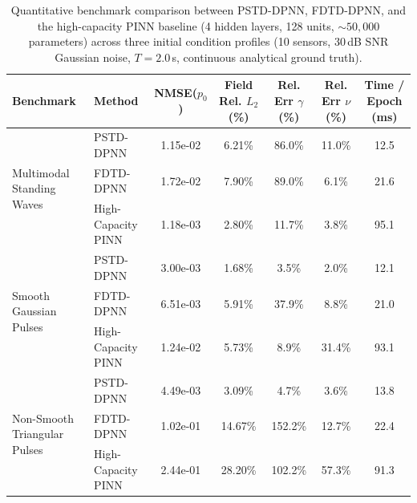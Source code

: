 \begin{table}[H]
\centering
\small
\caption{Quantitative benchmark comparison between PSTD-DPNN, FDTD-DPNN, and the high-capacity PINN baseline (4 hidden layers, 128 units, $\sim 50{,}000$ parameters) across three initial condition profiles (10 sensors, 30\,dB SNR Gaussian noise, $T = 2.0$\,s, continuous analytical ground truth).}
\label{tab:dpnn_pinn_comparison}
\begin{tabular}{llccccc}
\toprule
\textbf{Benchmark} & \textbf{Method} & \textbf{NMSE($p_0$)} & \textbf{Field Rel. $L_2$ (\%)} & \textbf{Rel. Err $\gamma$ (\%)} & \textbf{Rel. Err $\nu$ (\%)} & \textbf{Time / Epoch (ms)} \\
\midrule
\multirow{3}{*}{Multimodal Standing Waves} & PSTD-DPNN & 1.15e-02 & 6.21\% & 86.0\% & 11.0\% & 12.5 \\
 & FDTD-DPNN & 1.72e-02 & 7.90\% & 89.0\% & 6.1\% & 21.6 \\
 & High-Capacity PINN & 1.18e-03 & 2.80\% & 11.7\% & 3.8\% & 95.1 \\
\midrule
\multirow{3}{*}{Smooth Gaussian Pulses} & PSTD-DPNN & 3.00e-03 & 1.68\% & 3.5\% & 2.0\% & 12.1 \\
 & FDTD-DPNN & 6.51e-03 & 5.91\% & 37.9\% & 8.8\% & 21.0 \\
 & High-Capacity PINN & 1.24e-02 & 5.73\% & 8.9\% & 31.4\% & 93.1 \\
\midrule
\multirow{3}{*}{Non-Smooth Triangular Pulses} & PSTD-DPNN & 4.49e-03 & 3.09\% & 4.7\% & 3.6\% & 13.8 \\
 & FDTD-DPNN & 1.02e-01 & 14.67\% & 152.2\% & 12.7\% & 22.4 \\
 & High-Capacity PINN & 2.44e-01 & 28.20\% & 102.2\% & 57.3\% & 91.3 \\
\bottomrule
\end{tabular}
\end{table}
